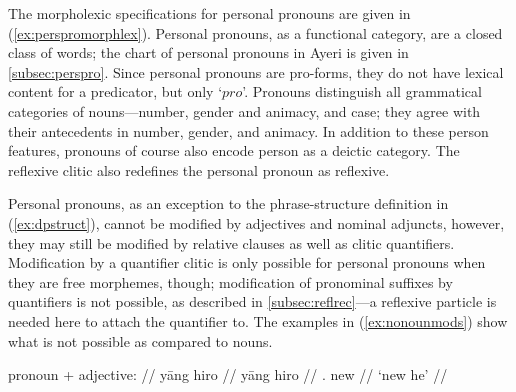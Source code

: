The morpholexic specifications for personal pronouns are given in
(\ref{ex:perspromorphlex}). Personal pronouns, as a functional category, are a
closed class of words; the chart of personal pronouns in Ayeri is given in
\autoref{subsec:perspro}. Since personal pronouns are pro-forms, they do not
have lexical content for a predicator, but only `$pro$'. Pronouns distinguish
all grammatical categories of nouns---number, gender and animacy, and case;
they agree with their antecedents in number, gender, and animacy. In addition
to these person features, pronouns of course also encode person as a deictic
category. The reflexive clitic  also redefines the
personal pronoun as reflexive.

\begin{morphlex}
\ex\label{ex:perspromorphlex}
\xe
\end{morphlex}

Personal pronouns, as an exception to the phrase-structure definition in 
(\ref{ex:dpstruct}), cannot be modified by adjectives and nominal adjuncts,
however, they may still be modified by relative clauses as well as clitic
quantifiers. Modification by a quantifier clitic is only possible for personal
pronouns when they are free morphemes, though; modification of pronominal
suffixes by quantifiers is not possible, as described in
\autoref{subsec:reflrec}---a reflexive particle is needed here to attach the
quantifier to. The examples in (\ref{ex:nonounmods}) show what is not possible
as compared to nouns.

\pex\label{ex:nonounmods}
\a\ljudge* %
	\begin{minipage}[t]{.5\linewidth}
	\begingl
		\glpreamble pronoun + adjective: //
		\gla yāng hiro //
		\glb yāng hiro //
		\glc \TsgM{}.\Aarg{} new //
		\glft `new he' //
	\endgl
	\end{minipage}

